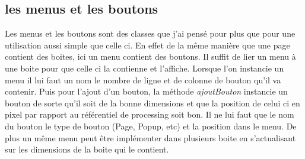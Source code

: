 \documentclass[10pt,a4paper]{article}
\begin{document}
\subsection{les menus et les boutons}
Les menus et les boutons sont des classes que j'ai pensé pour plus que pour une utilisation aussi simple que celle ci. En effet de la même manière que une page contient des boites, ici un menu contient des boutons. Il suffit de lier un menu à une boite pour que celle ci la contienne et l'affiche. Lorsque l'on instancie un menu il lui faut un nom le nombre de ligne et de colonne de bouton qu'il va contenir. Puis pour l'ajout d'un bouton, la méthode \textit{ajoutBouton} instancie un bouton de sorte qu'il soit de la bonne dimensions et que la position de celui ci en pixel par rapport au référentiel de processing soit bon. Il ne lui faut que le nom du bouton le type de bouton (Page, Popup, etc) et la position dans le menu. De plus un même menu peut être implémenter dans plusieurs boite en s'actualisant sur les dimensions de la boite qui le contient.
\end{document}
